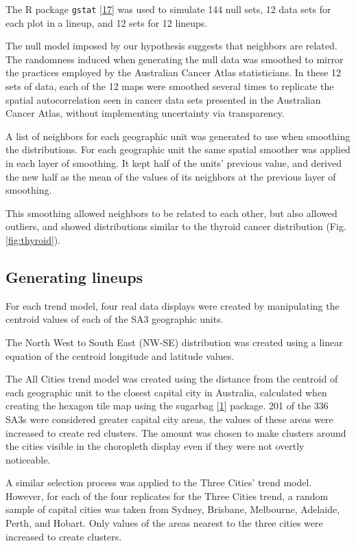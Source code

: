 \documentclass[conference,final,]{IEEEtran}
\begin{document}
The R package \texttt{gstat} {[}\protect\hyperlink{ref-gstat}{17}{]} was used to simulate 144 null sets, 12 data sets for each plot in a lineup, and 12 sets for 12 lineups.

The null model imposed by our hypothesis suggests that neighbors are related. The randomness induced when generating the null data was smoothed to mirror the practices employed by the Australian Cancer Atlas statisticians.
In these 12 sets of data, each of the 12 maps were smoothed several times to replicate the spatial autocorrelation seen in cancer data sets presented in the Australian Cancer Atlas, without implementing uncertainty via transparency.

A list of neighbors for each geographic unit was generated to use when smoothing the distributions. For each geographic unit the same spatial smoother was applied in each layer of smoothing. It kept half of the units' previous value, and derived the new half as the mean of the values of its neighbors at the previous layer of smoothing.

This smoothing allowed neighbors to be related to each other, but also allowed outliers, and showed distributions similar to the thyroid cancer distribution (Fig. \ref{fig:thyroid}).

\hypertarget{generating-lineups}{%
\subsection{Generating lineups}\label{generating-lineups}}

For each trend model, four real data displays were created by manipulating the centroid values of each of the SA3 geographic units.

The North West to South East (NW-SE) distribution was created using a linear equation of the centroid longitude and latitude values.

The All Cities trend model was created using the distance from the centroid of each geographic unit to the closest capital city in Australia, calculated when creating the hexagon tile map using the sugarbag {[}\protect\hyperlink{ref-sugarbag}{1}{]} package.
201 of the 336 SA3s were considered greater capital city areas, the values of these areas were increased to create red clusters. The amount was chosen to make clusters around the cities visible in the choropleth display even if they were not overtly noticeable.

A similar selection process was applied to the Three Cities' trend model. However, for each of the four replicates for the Three Cities trend, a random sample of capital cities was taken from Sydney, Brisbane, Melbourne, Adelaide, Perth, and Hobart. Only values of the areas nearest to the three cities were increased to create clusters.
\end{document}
